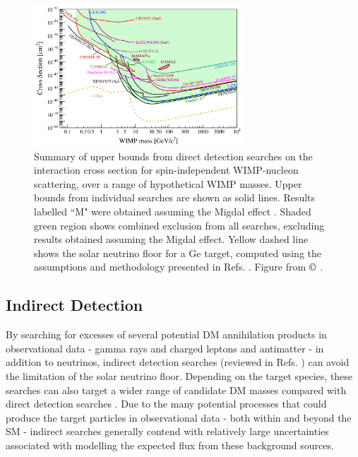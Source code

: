 \begin{figure}[h]
	\centering
	\includegraphics[width=0.7\textwidth]{Figures/1/dd_results.pdf}
	\caption[]{Summary of upper bounds from direct detection searches on the interaction cross section for spin-independent WIMP-nucleon scattering, over a range of hypothetical WIMP masses. Upper bounds from individual searches are shown as solid lines. Results labelled ``M" were obtained assuming the Migdal effect \cite{migdal_2018}. Shaded green region shows combined exclusion from all searches, excluding results obtained assuming the Migdal effect. Yellow dashed line shows the solar neutrino floor for a Ge target, computed using the assumptions and methodology presented in Refs. \cite{neutrino_floor_1, neutrino_floor_2}. Figure from \(\copyright\) \cite{billard2021direct}.}
	\label{fig:dd_limits}
\end{figure}

\subsection{Indirect Detection}

By searching for excesses of several potential DM annihilation products in observational data - gamma rays and charged leptons and antimatter - in addition to neutrinos, indirect detection searches (reviewed in Refs. \cite{conrad2014indirect, pdg_2020}) can avoid the limitation of the solar neutrino floor. Depending on the target species, these searches can also target a wider range of candidate DM masses compared with direct detection searches \cite{pdg_2020}. Due to the many potential processes that could produce the target particles in observational data - both within and beyond the SM - indirect searches generally contend with relatively large uncertainties associated with modelling the expected flux from these background sources. 

